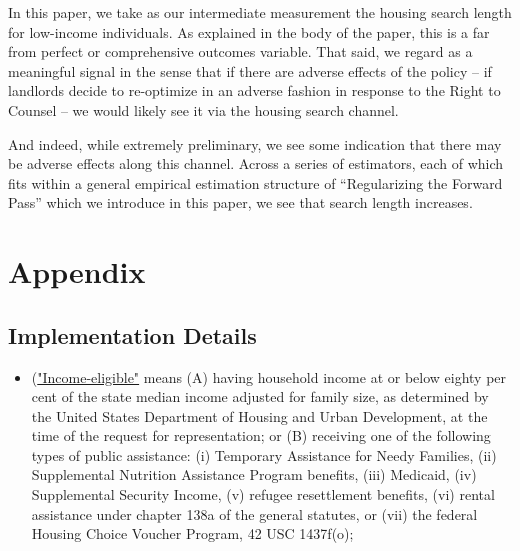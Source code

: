 \documentclass[a4paper,12pt]{article}
\begin{document}
In this paper, we take as our intermediate measurement the housing search length for low-income individuals. As explained in the body of the paper, this is a far from perfect or comprehensive outcomes variable. That said, we regard as a meaningful signal in the sense that if there are adverse effects of the policy -- if landlords decide to re-optimize in an adverse fashion in response to the Right to Counsel -- we would likely see it via the housing search channel. \par 
And indeed, while extremely preliminary, we see some indication that there may be adverse effects along this channel. Across a series of estimators, each of which fits within a general empirical estimation structure of ``Regularizing the Forward Pass'' which we introduce in this paper, we see that search length increases.

%


\section{Appendix}
\subsection{Implementation Details}
\begin{itemize}
    \item (\href{https://www.cga.ct.gov/2021/ACT/PA/PDF/2021PA-00034-R00HB-06531-PA.PDF}{"Income-eligible"} means (A) having household income at or below
eighty per cent of the state median income adjusted for family size, as
determined by the United States Department of Housing and Urban
Development, at the time of the request for representation; or (B)
receiving one of the following types of public assistance: (i) Temporary
Assistance for Needy Families, (ii) Supplemental Nutrition Assistance
Program benefits, (iii) Medicaid, (iv) Supplemental Security Income, (v)
refugee resettlement benefits, (vi) rental assistance under chapter 138a
of the general statutes, or (vii) the federal Housing Choice Voucher
Program, 42 USC 1437f(o);
\end{itemize}
\end{document}
